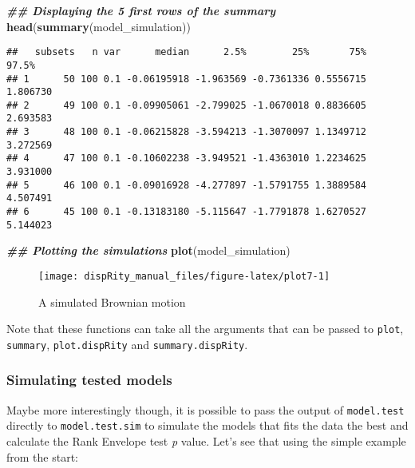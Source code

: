 \documentclass[
]{book}
\newenvironment{Shaded}{\begin{snugshade}}{\end{snugshade}}
\newcommand{\DocumentationTok}[1]{\textcolor[rgb]{0.56,0.35,0.01}{\textbf{\textit{#1}}}}
\newcommand{\FunctionTok}[1]{\textcolor[rgb]{0.13,0.29,0.53}{\textbf{#1}}}
\newcommand{\NormalTok}[1]{#1}
\begin{document}
\begin{Shaded}
\begin{Highlighting}[]
\DocumentationTok{\#\# Displaying the 5 first rows of the summary}
\FunctionTok{head}\NormalTok{(}\FunctionTok{summary}\NormalTok{(model\_simulation))}
\end{Highlighting}
\end{Shaded}

\begin{verbatim}
##   subsets   n var      median      2.5%        25%       75%    97.5%
## 1      50 100 0.1 -0.06195918 -1.963569 -0.7361336 0.5556715 1.806730
## 2      49 100 0.1 -0.09905061 -2.799025 -1.0670018 0.8836605 2.693583
## 3      48 100 0.1 -0.06215828 -3.594213 -1.3070097 1.1349712 3.272569
## 4      47 100 0.1 -0.10602238 -3.949521 -1.4363010 1.2234625 3.931000
## 5      46 100 0.1 -0.09016928 -4.277897 -1.5791755 1.3889584 4.507491
## 6      45 100 0.1 -0.13183180 -5.115647 -1.7791878 1.6270527 5.144023
\end{verbatim}

\begin{Shaded}
\begin{Highlighting}[]
\DocumentationTok{\#\# Plotting the simulations}
\FunctionTok{plot}\NormalTok{(model\_simulation)}
\end{Highlighting}
\end{Shaded}

\begin{figure}

{\centering \texttt{[image: dispRity\_manual\_files/figure-latex/plot7-1]} 

}

\caption{A simulated Brownian motion}\label{fig:plot7}
\end{figure}

Note that these functions can take all the arguments that can be passed to \texttt{plot}, \texttt{summary}, \texttt{plot.dispRity} and \texttt{summary.dispRity}.

\hypertarget{simulating-tested-models}{%
\subsubsection{Simulating tested models}\label{simulating-tested-models}}

Maybe more interestingly though, it is possible to pass the output of \texttt{model.test} directly to \texttt{model.test.sim} to simulate the models that fits the data the best and calculate the Rank Envelope test \emph{p} value.
Let's see that using the simple example from the start:
\end{document}
